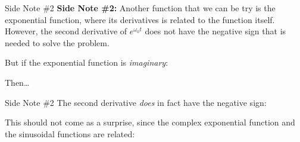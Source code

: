 \documentclass[12pt,compress,aspectratio=169]{beamer}
\begin{document}
\begin{frame}{Side Note \#2}
  \textbf{Side Note \#2:} Another function that we can be try is the
  exponential function, where its derivatives is related to the function
  itself. However, the second derivative of $e^{\omega_0t}$ does not have the
  negative sign that is needed to solve the problem.


  But if the exponential function is \emph{imaginary}:


  \vspace{-.1in}Then\ldots
\end{frame}



\begin{frame}{Side Note \#2}
  The second derivative \emph{does} in fact have the negative sign:

  
  This should not come as a surprise, since the complex exponential function
  and the sinusoidal functions are related:

\end{frame}
\end{document}
